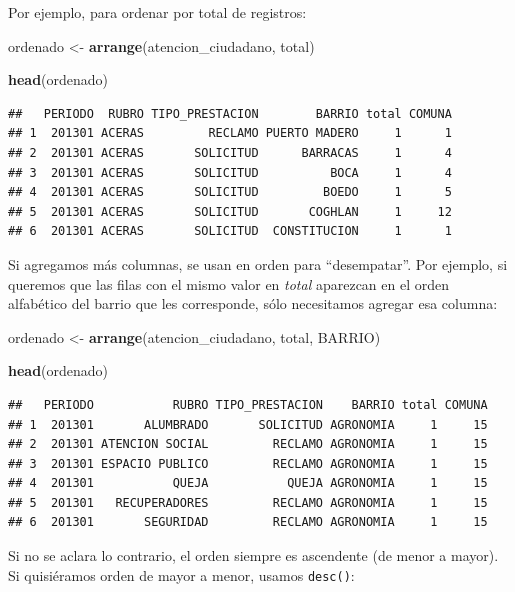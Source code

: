 \documentclass[]{book}
\newenvironment{Shaded}{\begin{snugshade}}{\end{snugshade}}
\newcommand{\KeywordTok}[1]{\textcolor[rgb]{0.13,0.29,0.53}{\textbf{#1}}}
\newcommand{\StringTok}[1]{\textcolor[rgb]{0.31,0.60,0.02}{#1}}
\newcommand{\NormalTok}[1]{#1}
\begin{document}
Por ejemplo, para ordenar por total de registros:

\begin{Shaded}
\begin{Highlighting}[]
\NormalTok{ordenado <-}\StringTok{ }\KeywordTok{arrange}\NormalTok{(atencion_ciudadano, total)}

\KeywordTok{head}\NormalTok{(ordenado)}
\end{Highlighting}
\end{Shaded}

\begin{verbatim}
##   PERIODO  RUBRO TIPO_PRESTACION        BARRIO total COMUNA
## 1  201301 ACERAS         RECLAMO PUERTO MADERO     1      1
## 2  201301 ACERAS       SOLICITUD      BARRACAS     1      4
## 3  201301 ACERAS       SOLICITUD          BOCA     1      4
## 4  201301 ACERAS       SOLICITUD         BOEDO     1      5
## 5  201301 ACERAS       SOLICITUD       COGHLAN     1     12
## 6  201301 ACERAS       SOLICITUD  CONSTITUCION     1      1
\end{verbatim}

Si agregamos más columnas, se usan en orden para ``desempatar''. Por
ejemplo, si queremos que las filas con el mismo valor en \emph{total}
aparezcan en el orden alfabético del barrio que les corresponde, sólo
necesitamos agregar esa columna:

\begin{Shaded}
\begin{Highlighting}[]
\NormalTok{ordenado <-}\StringTok{ }\KeywordTok{arrange}\NormalTok{(atencion_ciudadano, total, BARRIO)}

\KeywordTok{head}\NormalTok{(ordenado)}
\end{Highlighting}
\end{Shaded}

\begin{verbatim}
##   PERIODO           RUBRO TIPO_PRESTACION    BARRIO total COMUNA
## 1  201301       ALUMBRADO       SOLICITUD AGRONOMIA     1     15
## 2  201301 ATENCION SOCIAL         RECLAMO AGRONOMIA     1     15
## 3  201301 ESPACIO PUBLICO         RECLAMO AGRONOMIA     1     15
## 4  201301           QUEJA           QUEJA AGRONOMIA     1     15
## 5  201301   RECUPERADORES         RECLAMO AGRONOMIA     1     15
## 6  201301       SEGURIDAD         RECLAMO AGRONOMIA     1     15
\end{verbatim}

Si no se aclara lo contrario, el orden siempre es ascendente (de menor a
mayor). Si quisiéramos orden de mayor a menor, usamos \texttt{desc()}:
\end{document}
